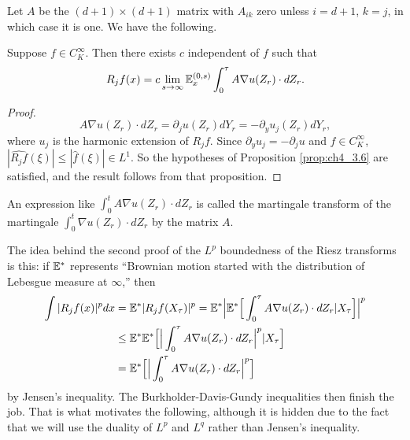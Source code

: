 Let $A$ be the $(d+1)\times(d+1)$ matrix with $A_{ik}$ zero unless $i=d+1$, $k=j$, in which case it is one. We have the following.

\begin{corollary}\label{cor:ch4_3.7}
Suppose $f \in C_K^\infty$. Then there exists $c$ independent of $f$ such that
\[
    R_j f(x) = c\lim_{s\to\infty} \mathbb{E}_x^{(0,s)} \int_0^{\tau} A\nabla u(Z_r)\cdot dZ_r.
\]
\end{corollary}

\begin{proof}
\[
    A\nabla u(Z_r)\cdot dZ_r = \partial_j u(Z_r)dY_r = -\partial_y u_j(Z_r)dY_r,
\]
 where $u_j$ is the harmonic extension of $R_j f$. Since $\partial_y u_j = -\partial_j u$ and $f \in C_K^\infty$, $|\widehat{R_j f}(\xi)| \leq |\widehat{f}(\xi)| \in L^1$. So the hypotheses of Proposition \ref{prop:ch4_3.6} are satisfied, and the result follows from that proposition.
\end{proof}

An expression like $\int_0^t A\nabla u(Z_r)\cdot dZ_r$ is called the martingale transform of the martingale $\int_0^t \nabla u(Z_r)\cdot dZ_r$ by the matrix $A$.
\vspace*{1\baselineskip}

The idea behind the second proof of the $L^p$ boundedness of the Riesz transforms is this: if $\mathbb{E}^*$ represents ``Brownian motion started with the distribution of Lebesgue measure at $\infty$,'' then
\begin{align*}
    \int |R_j f(x)|^p dx &= \mathbb{E}^*|R_j f(X_\tau)|^p = \mathbb{E}^*\Big|\mathbb{E}^*\Big[\int_0^{\tau} A\nabla u(Z_r)\cdot dZ_r| X_\tau\Big]\Big|^p \\
    &\leq \mathbb{E}^*\mathbb{E}^*\Big[\Big|\int_0^{\tau} A\nabla u(Z_r)\cdot dZ_r\Big|^p| X_\tau\Big] \\
    &= \mathbb{E}^*\Big[\Big|\int_0^{\tau} A\nabla u(Z_r)\cdot dZ_r\Big|^p\Big]
\end{align*}
by Jensen's inequality. The Burkholder-Davis-Gundy inequalities then finish the job. That is what motivates the following, although it is hidden due to the fact that we will use the duality of $L^p$ and $L^q$ rather than Jensen's inequality.

